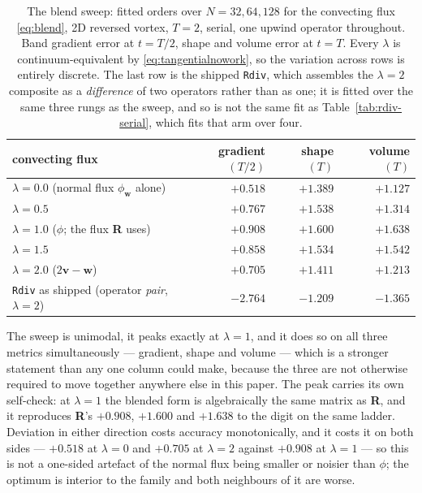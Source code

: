 \documentclass[preprint,3p,11pt]{elsarticle}
\begin{document}
\begin{table}[htbp]
\centering
\caption{The blend sweep: fitted orders over $N = 32, 64, 128$ for the convecting
flux \eqref{eq:blend}, 2D reversed vortex, $T=2$, serial, one upwind operator
throughout. Band gradient error at $t=T/2$, shape and volume error at $t=T$. Every
$\lambda$ is continuum-equivalent by \eqref{eq:tangentialnowork}, so the variation
across rows is entirely discrete. The last row is the shipped \texttt{Rdiv}, which
assembles the $\lambda=2$ composite as a \emph{difference} of two operators rather
than as one; it is fitted over the same three rungs as the sweep, and so is not the
same fit as Table~\ref{tab:rdiv-serial}, which fits that arm over four.}
\label{tab:rdiv-blend}
\small
\begin{tabular}{lrrr}
\toprule
convecting flux & gradient $(T/2)$ & shape $(T)$ & volume $(T)$ \\
\midrule
$\lambda = 0.0$ \quad(normal flux $\phi_{\mathbf{w}}$ alone) & $+0.518$ & $+1.389$ & $+1.127$ \\
$\lambda = 0.5$                                             & $+0.767$ & $+1.538$ & $+1.314$ \\
$\lambda = 1.0$ \quad($\phi$; the flux \textbf{R} uses)     & $\mathbf{+0.908}$ & $\mathbf{+1.600}$ & $\mathbf{+1.638}$ \\
$\lambda = 1.5$                                             & $+0.858$ & $+1.534$ & $+1.542$ \\
$\lambda = 2.0$ \quad($2\mathbf{v}-\mathbf{w}$)             & $+0.705$ & $+1.411$ & $+1.213$ \\
\addlinespace
\texttt{Rdiv} as shipped (operator \emph{pair}, $\lambda=2$) & $-2.764$ & $-1.209$ & $-1.365$ \\
\bottomrule
\end{tabular}
\end{table}

The sweep is unimodal, it peaks exactly at $\lambda = 1$, and it does so on all
three metrics simultaneously --- gradient, shape and volume --- which is a
stronger statement than any one column could make, because the three are not
otherwise required to move together anywhere else in this paper. The peak carries
its own self-check: at $\lambda = 1$ the blended form is algebraically the same
matrix as \textbf{R}, and it reproduces \textbf{R}'s $+0.908$, $+1.600$ and
$+1.638$ to the digit on the same ladder. Deviation in either direction costs
accuracy monotonically, and it costs it on both sides --- $+0.518$ at $\lambda=0$
and $+0.705$ at $\lambda=2$ against $+0.908$ at $\lambda=1$ --- so this is not a
one-sided artefact of the normal flux being smaller or noisier than $\phi$; the
optimum is interior to the family and both neighbours of it are worse.
\end{document}
